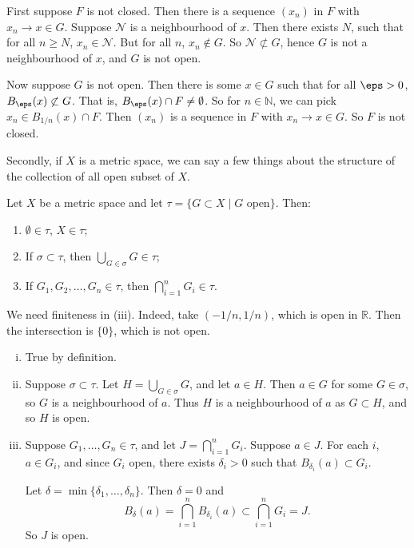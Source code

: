 \documentclass[12pt]{article}
\begin{document}
\begin{proofbox}
	First suppose $F$ is not closed. Then there is a sequence $(x_n)$ in $F$ with $x_n \to x \in G$. Suppose $\mathcal{N}$ is a neighbourhood of $x$. Then there exists $N$, such that for all $n \geq N$, $x_n \in \mathcal{N}$. But for all $n$, $x_n \not \in G$. So $\mathcal{N} \not \subset G$, hence $G$ is not a neighbourhood of $x$, and $G$ is not open.

	Now suppose $G$ is not open. Then there is some $x \in G$ such that for all $\eps > 0$, $B_{\eps}(x) \not \subset G$. That is, $B_{\eps}(x) \cap F \neq \emptyset$. So for $n \in \mathbb{N}$, we can pick $x_n \in B_{1/n}(x) \cap F$. Then $(x_n)$ is a sequence in $F$ with $x_n \to x \in G$. So $F$ is not closed.
\end{proofbox}

Secondly, if $X$ is a metric space, we can say a few things about the structure of the collection of all open subset of $X$.

\begin{proposition}
	Let $X$ be a metric space and let $\tau = \{G \subset X \mid G \text{ open}\}$. Then:
	\begin{enumerate}[\normalfont(i)]
		\item $\emptyset \in \tau$, $X \in \tau$;
		\item If $\sigma \subset \tau$, then $\bigcup_{G \in \sigma}G \in \tau$;
		\item If $G_1, G_2, \ldots, G_n \in \tau$, then $\bigcap_{i = 1}^{n} G_i \in \tau$.
	\end{enumerate}
\end{proposition}

\begin{remark}
	We need finiteness in (iii). Indeed, take $(-1/n, 1/n)$, which is open in $\mathbb{R}$. Then the intersection is $\{0\}$, which is not open.
\end{remark}

\begin{proofbox}
	\begin{enumerate}[(i)]
		\item True by definition.
		\item Suppose $\sigma \subset \tau$. Let $H = \bigcup_{G \in \sigma} G$, and let $a \in H$. Then $a \in G$ for some $G \in \sigma$, so $G$ is a neighbourhood of $a$. Thus $H$ is a neighbourhood of $a$ as $G \subset H$, and so $H$ is open.
		\item Suppose $G_1, \ldots, G_n \in \tau$, and let $J = \bigcap_{i = 1}^{n}G_i$. Suppose $a \in J$. For each $i$, $a \in G_i$, and since $G_i$ open, there exists $\delta_i > 0$ such that $B_{\delta_i}(a) \subset G_i$.

			Let $\delta = \min\{\delta_1, \ldots, \delta_n\}$. Then $\delta = 0$ and
			\[
				B_{\delta}(a) = \bigcap_{i = 1}^{n} B_{\delta_i}(a) \subset \bigcap_{i = 1}^{n} G_i = J
			.\]
			So $J$ is open.
	\end{enumerate}
\end{proofbox}
\end{document}
